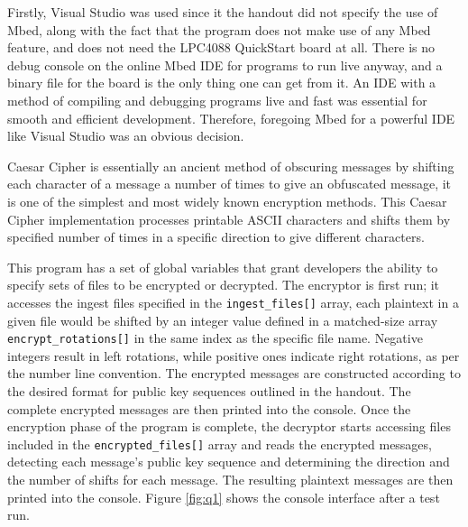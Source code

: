 \documentclass{article}
\begin{document}
Firstly, Visual Studio was used since it the handout did not specify the use of Mbed, along with the fact that the program does not make use of any Mbed feature, and does not need the LPC4088 QuickStart board at all. There is no debug console on the online Mbed IDE for programs to run live anyway, and a binary file for the board is the only thing one can get from it. An IDE with a method of compiling and debugging programs live and fast was essential for smooth and efficient development. Therefore, foregoing Mbed for a powerful IDE like Visual Studio was an obvious decision.

Caesar Cipher is essentially an ancient method of obscuring messages by shifting each character of a message a number of times to give an obfuscated message, it is one of the simplest and most widely known encryption methods. This Caesar Cipher implementation processes printable ASCII characters and shifts them by specified number of times in a specific direction to give different characters.

This program has a set of global variables that grant developers the ability to specify sets of files to be encrypted or decrypted. The encryptor is first run; it accesses the ingest files specified in the \texttt{ingest\_files[]} array, each plaintext in a given file would be shifted by an integer value defined in a matched-size array \texttt{encrypt\_rotations[]} in the same index as the specific file name. Negative integers result in left rotations, while positive ones indicate right rotations, as per the number line convention. The encrypted messages are constructed according to the desired format for public key sequences outlined in the handout. The complete encrypted messages are then printed into the console. Once the encryption phase of the program is complete, the decryptor starts accessing files included in the \texttt{encrypted\_files[]} array and reads the encrypted messages, detecting each message's public key sequence and determining the direction and the number of shifts for each message. The resulting plaintext messages are then printed into the console. Figure \ref{fig:q1} shows the console interface after a test run.
\end{document}
